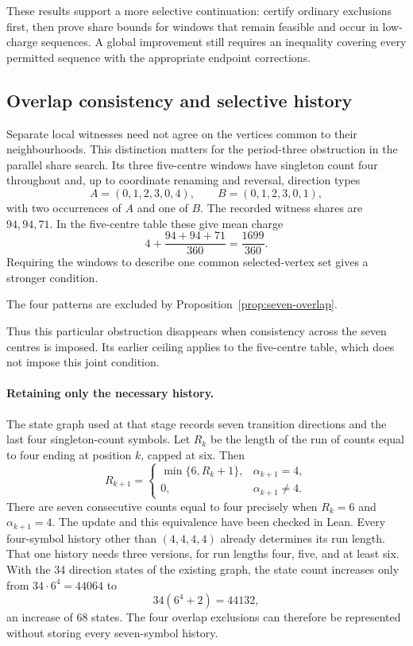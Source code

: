 \documentclass[11pt,a4paper]{article}
\theoremstyle{definition}
\theoremstyle{remark}
\begin{document}
These results support a more selective continuation: certify ordinary exclusions first, then prove share bounds for windows that remain feasible and occur in low-charge sequences. A global improvement still requires an inequality covering every permitted sequence with the appropriate endpoint corrections.

\subsection{Overlap consistency and selective history}
Separate local witnesses need not agree on the vertices common to their neighbourhoods. This distinction matters for the period-three obstruction in the parallel share search. Its three five-centre windows have singleton count four throughout and, up to coordinate renaming and reversal, direction types
\[
A=(0,1,2,3,0,4),\qquad B=(0,1,2,3,0,1),
\]
with two occurrences of $A$ and one of $B$. The recorded witness shares are $94,94,71$. In the five-centre table these give mean charge
\[
4+\frac{94+94+71}{360}=\frac{1699}{360}.
\]
Requiring the windows to describe one common selected-vertex set gives a stronger condition.

The four patterns are excluded by Proposition~\ref{prop:seven-overlap}.


Thus this particular obstruction disappears when consistency across the seven centres is imposed. Its earlier ceiling applies to the five-centre table, which does not impose this joint condition.

\paragraph{Retaining only the necessary history.}
The state graph used at that stage records seven transition directions and the last four singleton-count symbols. Let $R_k$ be the length of the run of counts equal to four ending at position $k$, capped at six. Then
\[
R_{k+1}=\begin{cases}
\min\{6,R_k+1\},&\alpha_{k+1}=4,\\
0,&\alpha_{k+1}\ne4.
\end{cases}
\]
There are seven consecutive counts equal to four precisely when $R_k=6$ and $\alpha_{k+1}=4$. The update and this equivalence have been checked in Lean. Every four-symbol history other than $(4,4,4,4)$ already determines its run length. That one history needs three versions, for run lengths four, five, and at least six. With the 34 direction states of the existing graph, the state count increases only from $34\cdot6^4=44064$ to
\[
34(6^4+2)=44132,
\]
an increase of 68 states. The four overlap exclusions can therefore be represented without storing every seven-symbol history.
\end{document}
